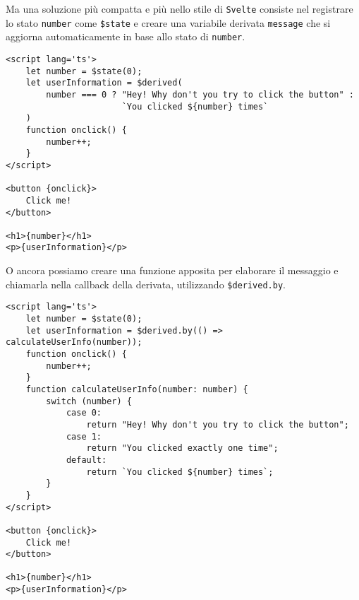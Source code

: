 \documentclass[12pt]{article}
\begin{document}
Ma una soluzione più compatta e più nello stile di \texttt{Svelte} consiste
nel registrare lo stato \texttt{number} come \texttt{\$state} e 
creare una variabile derivata \texttt{message} che si aggiorna automaticamente
in base allo stato di \texttt{number}.

\begin{verbatim}
<script lang='ts'>
    let number = $state(0);
    let userInformation = $derived(
        number === 0 ? "Hey! Why don't you try to click the button" :
                       `You clicked ${number} times`
    )
    function onclick() {
        number++;
    }
</script>

<button {onclick}>
    Click me!
</button>

<h1>{number}</h1>
<p>{userInformation}</p>
\end{verbatim}

O ancora possiamo creare una funzione apposita per elaborare il messaggio 
e chiamarla nella callback della derivata, utilizzando {\tt \$derived.by}.

\begin{verbatim}
<script lang='ts'>
    let number = $state(0);
    let userInformation = $derived.by(() => calculateUserInfo(number));
    function onclick() {
        number++;
    }
    function calculateUserInfo(number: number) {
        switch (number) {
            case 0:
                return "Hey! Why don't you try to click the button";
            case 1:
                return "You clicked exactly one time";
            default:
                return `You clicked ${number} times`;
        }
    }
</script>

<button {onclick}>
    Click me!
</button>

<h1>{number}</h1>
<p>{userInformation}</p>
\end{verbatim}
\end{document}

